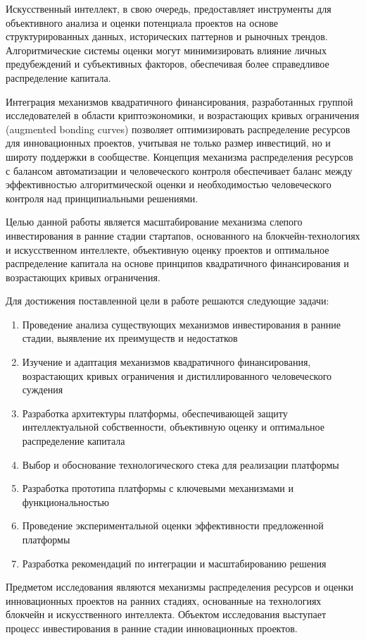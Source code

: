 \documentclass[
    candidate, %
    subf, %
    dotsinheaders=false,
]{disser}
\begin{document}
Искусственный интеллект, в свою очередь, предоставляет инструменты для объективного анализа и оценки потенциала проектов на основе структурированных данных, исторических паттернов и рыночных трендов. Алгоритмические системы оценки могут минимизировать влияние личных предубеждений и субъективных факторов, обеспечивая более справедливое распределение капитала.

Интеграция механизмов квадратичного финансирования, разработанных группой исследователей в области криптоэкономики, и возрастающих кривых ограничения (augmented bonding curves) позволяет оптимизировать распределение ресурсов для инновационных проектов, учитывая не только размер инвестиций, но и широту поддержки в сообществе. Концепция механизма распределения ресурсов с балансом автоматизации и человеческого контроля обеспечивает баланс между эффективностью алгоритмической оценки и необходимостью человеческого контроля над принципиальными решениями.

Целью данной работы является масштабирование механизма слепого инвестирования в ранние стадии стартапов, основанного на блокчейн-технологиях и искусственном интеллекте, объективную оценку проектов и оптимальное распределение капитала на основе принципов квадратичного финансирования и возрастающих кривых ограничения.

Для достижения поставленной цели в работе решаются следующие задачи:
\begin{enumerate}
  \item Проведение анализа существующих механизмов инвестирования в ранние стадии, выявление их преимуществ и недостатков
  \item Изучение и адаптация механизмов квадратичного финансирования, возрастающих кривых ограничения и дистиллированного человеческого суждения
  \item Разработка архитектуры платформы, обеспечивающей защиту интеллектуальной собственности, объективную оценку и оптимальное распределение капитала
  \item Выбор и обоснование технологического стека для реализации платформы
  \item Разработка прототипа платформы с ключевыми механизмами и функциональностью
  \item Проведение экспериментальной оценки эффективности предложенной платформы
  \item Разработка рекомендаций по интеграции и масштабированию решения
\end{enumerate}

Предметом исследования являются механизмы распределения ресурсов и оценки инновационных проектов на ранних стадиях, основанные на технологиях блокчейн и искусственного интеллекта. Объектом исследования выступает процесс инвестирования в ранние стадии инновационных проектов.
\end{document}
